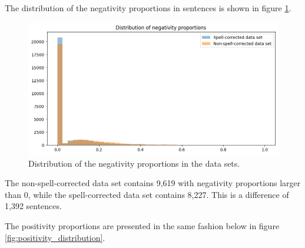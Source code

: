 \begin{table}
    \centering
    \caption{Description of the sentiment analyses distributions.}
    \label{tab:sentiment_analysis}
\end{table}

The distribution of the negativity proportions in sentences is shown in figure \ref{fig:negativity_distribution}.

\begin{figure}[H]
    \centering
    \includegraphics[width=\textwidth]{resources/negativity_distributions.png}
    \caption{Distribution of the negativity proportions in the data sets.}
    \label{fig:negativity_distribution}
\end{figure}

The non-spell-corrected data set contains 9,619 with negativity proportions larger than 0, while the spell-corrected data set contains 8,227. This is a difference of 1,392 sentences.

The positivity proportions are presented in the same fashion below in figure \ref{fig:positivity_distribution}.

